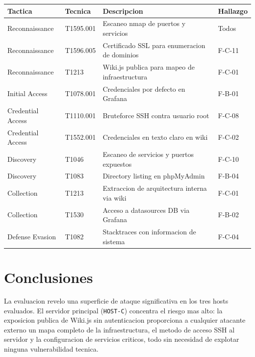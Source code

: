 \documentclass[11pt,a4paper]{article}
\begin{document}
\begin{center}
\begin{tabularx}{\textwidth}{llXl}
\toprule
\textbf{Tactica} & \textbf{Tecnica} & \textbf{Descripcion} & \textbf{Hallazgo} \\
\midrule
Reconnaissance       & T1595.001 & Escaneo nmap de puertos y servicios            & Todos \\
Reconnaissance       & T1596.005 & Certificado SSL para enumeracion de dominios   & F-C-11 \\
Reconnaissance       & T1213     & Wiki.js publica para mapeo de infraestructura  & F-C-01 \\
Initial Access       & T1078.001 & Credenciales por defecto en Grafana            & F-B-01 \\
Credential Access    & T1110.001 & Bruteforce SSH contra usuario root             & F-C-08 \\
Credential Access    & T1552.001 & Credenciales en texto claro en wiki            & F-C-02 \\
Discovery            & T1046     & Escaneo de servicios y puertos expuestos       & F-C-10 \\
Discovery            & T1083     & Directory listing en phpMyAdmin                & F-B-04 \\
Collection           & T1213     & Extraccion de arquitectura interna via wiki    & F-C-01 \\
Collection           & T1530     & Acceso a datasources DB via Grafana            & F-B-02 \\
Defense Evasion      & T1082     & Stacktraces con informacion de sistema         & F-C-04 \\
\bottomrule
\end{tabularx}
\end{center}

\newpage

\section{Conclusiones}

La evaluacion revelo una superficie de ataque significativa en los tres hosts
evaluados. El servidor principal (\texttt{HOST-C}) concentra el riesgo
mas alto: la exposicion publica de Wiki.js sin autenticacion proporciona a
cualquier atacante externo un mapa completo de la infraestructura, el metodo
de acceso SSH al servidor y la configuracion de servicios criticos, todo sin
necesidad de explotar ninguna vulnerabilidad tecnica.
\end{document}
